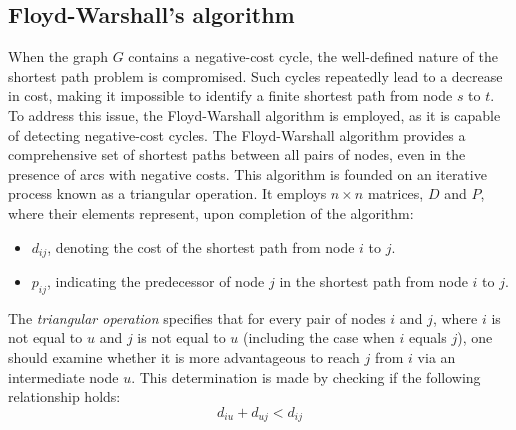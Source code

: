 \documentclass[12pt, a4paper]{report}
\begin{document}
    \subsection{Floyd-Warshall's algorithm}
    When the graph $G$ contains a negative-cost cycle, the well-defined nature of the shortest path problem is compromised. 
    Such cycles repeatedly lead to a decrease in cost, making it impossible to identify a finite shortest path from node $s$ to $t$.
    To address this issue, the Floyd-Warshall algorithm is employed, as it is capable of detecting negative-cost cycles.
    The Floyd-Warshall algorithm provides a comprehensive set of shortest paths between all pairs of nodes, even in the presence of arcs with negative costs. 
    This algorithm is founded on an iterative process known as a triangular operation.
    It employs $n \times n$ matrices, $D$ and $P$, where their elements represent, upon completion of the algorithm:
    \begin{itemize}
        \item $d_{ij}$, denoting the cost of the shortest path from node $i$ to $j$.
        \item $p_{ij}$, indicating the predecessor of node $j$ in the shortest path from node $i$ to $j$.
    \end{itemize}

    \begin{definition}
        The \emph{triangular operation} specifies that for every pair of nodes $i$ and $j$, where $i$ is not equal to $u$ and $j$ is not equal to $u$ (including the case when $i$ equals $j$), one should examine whether it is more advantageous to reach $j$ from $i$ via an intermediate node $u$. 
        This determination is made by checking if the following relationship holds:
        \[d_{iu}+d_{uj} < d_{ij}\]
    \end{definition}
\end{document}
